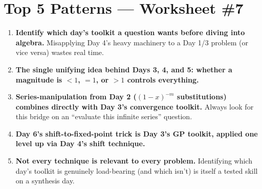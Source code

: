 \documentclass[11pt,a4paper]{article}
\begin{document}
\begin{enumerate}

\end{enumerate}

\section*{Top 5 Patterns --- Worksheet \#7}
\begin{enumerate}[leftmargin=2em,itemsep=4pt]
  \item \textbf{Identify which day's toolkit a question wants before diving into algebra.} Misapplying Day 4's heavy machinery to a Day 1/3 problem (or vice versa) wastes real time. 
  \item \textbf{The single unifying idea behind Days 3, 4, and 5: whether a magnitude is $<1$, $=1$, or $>1$ controls everything.} 
  \item \textbf{Series-manipulation from Day 2 ($(1-x)^{-m}$ substitutions) combines directly with Day 3's convergence toolkit.} Always look for this bridge on an ``evaluate this infinite series'' question. 
  \item \textbf{Day 6's shift-to-fixed-point trick is Day 3's GP toolkit, applied one level up via Day 4's shift technique.} 
  \item \textbf{Not every technique is relevant to every problem.} Identifying which day's toolkit is genuinely load-bearing (and which isn't) is itself a tested skill on a synthesis day. 
\end{enumerate}
\end{document}
